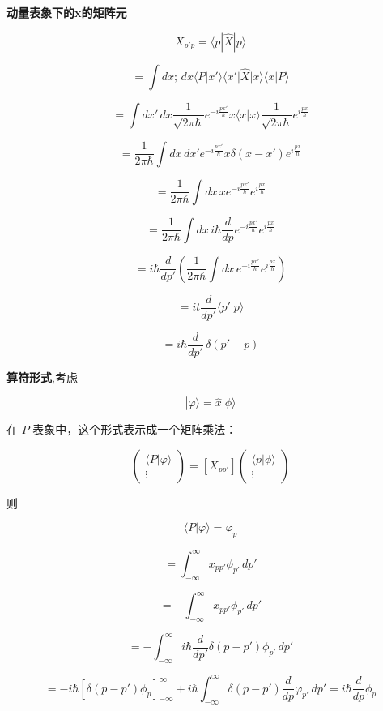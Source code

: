 \documentclass[lang=cn,15pt]{elegantbook}
\begin{document}
\textbf{动量表象下的x的矩阵元}

\[
X_{p'p} = \langle p | \hat{X} | p \rangle
\]

\[
= \int dx; \, dx \langle P | x' \rangle \langle x' | \hat{X} | x \rangle \langle x | P \rangle
\]

\[
= \int dx' \, dx \frac{1}{\sqrt{2\pi \hbar}} e^{-i \frac{p x'}{\hbar}} x \langle x | x \rangle \frac{1}{\sqrt{2\pi \hbar}} e^{i \frac{p x}{\hbar}}
\]

\[
= \frac{1}{2\pi \hbar} \int dx \, dx' e^{-i \frac{p x'}{\hbar}} x \delta(x - x') e^{i \frac{p x}{\hbar}}
\]

\[
= \frac{1}{2\pi \hbar} \int dx \, x e^{-i \frac{p x'}{\hbar}} e^{i \frac{p x}{\hbar}}
\]

\[
= \frac{1}{2\pi \hbar} \int dx \, i\hbar \frac{d}{dp} e^{-i \frac{p x'}{\hbar}} e^{i \frac{p x}{\hbar}}
\]

\[
= i\hbar \frac{d}{dp'} \left( \frac{1}{2\pi \hbar} \int dx \, e^{-i \frac{p x'}{\hbar}} e^{i \frac{p x}{\hbar}} \right)
\]

\[
= it \frac{d}{dp'} \langle p' | p \rangle
\]

\[
= i \hbar \frac{d}{dp'}  \, \delta( p' - p)
\]

\textbf{算符形式},考虑

\[
| \varphi \rangle = \hat{x} | \phi \rangle
\]

在 $P$ 表象中，这个形式表示成一个矩阵乘法：

\[
\begin{pmatrix}
	\langle P | \varphi \rangle \\
	\vdots
\end{pmatrix} = [X_{pp'}]
\begin{pmatrix}
	\langle p | \phi \rangle \\
	\vdots
\end{pmatrix}
\]

则 

\[
\langle P | \varphi \rangle = \varphi_p
\]

\[
= \int_{-\infty}^{\infty} x_{pp'} \phi_{p'} \, dp'
\]

\[
= -\int_{-\infty}^{\infty} x_{pp'} \phi_{p'} \, dp'
\]

\[
= -\int_{-\infty}^{\infty} i \hbar \frac{d}{dp'} \delta(p - p') \phi_{p'} \, dp'
\]

\[
= -i \hbar \left[ \delta(p - p') \phi_p \right]_{-\infty}^{\infty} + i \hbar \int_{-\infty}^{\infty} \delta(p - p') \frac{d}{dp} \varphi_{p'} \, dp'=i\hbar\frac{d}{dp}\phi_p
\]
\end{document}
